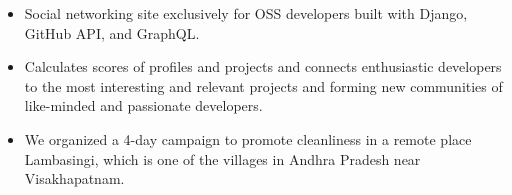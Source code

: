 \documentclass[10pt,a4paper]{style}
\begin{document}
\divider

\begin{itemize}
  \item Social networking site exclusively for OSS developers built with Django, GitHub API, and GraphQL.
  \item Calculates scores of profiles and projects and connects enthusiastic developers to the most interesting and relevant projects and forming new communities of like-minded and passionate developers.
\end{itemize}

\divider

\begin{itemize}
  \item We organized a 4-day campaign to promote cleanliness in a remote place Lambasingi, which is one of the villages in Andhra Pradesh near Visakhapatnam.
\end{itemize}

%






\end{document}
